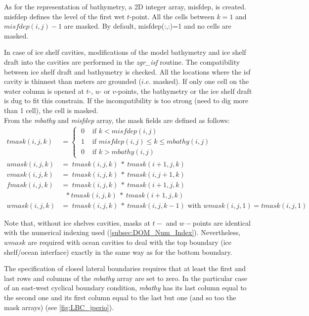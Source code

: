 \documentclass[../tex_main/NEMO_manual]{subfiles}
\begin{document}
As for the representation of bathymetry, a 2D integer array, misfdep, is created.
misfdep defines the level of the first wet $t$-point.
All the cells between $k=1$ and $misfdep(i,j)-1$ are masked.
By default, misfdep(:,:)=1 and no cells are masked.

In case of ice shelf cavities, modifications of the model bathymetry and ice shelf draft into 
the cavities are performed in the \textit{zgr\_isf} routine.
The compatibility between ice shelf draft and bathymetry is checked. 
All the locations where the isf cavity is thinnest than  meters are grounded ($i.e.$ masked). 
If only one cell on the water column is opened at $t$-, $u$- or $v$-points,
the bathymetry or the ice shelf draft is dug to fit this constrain.
If the incompatibility is too strong (need to dig more than 1 cell), the cell is masked.\\ 

From the \textit{mbathy} and \textit{misfdep} array, the mask fields are defined as follows:
\begin{align*}
tmask(i,j,k) &= \begin{cases}   \; 0&   \text{ if $k < misfdep(i,j) $ } \\
                                \; 1&   \text{ if $misfdep(i,j) \leq k\leq mbathy(i,j)$  }    \\
                                \; 0&   \text{ if $k > mbathy(i,j)$  }    \end{cases}     \\
umask(i,j,k) &=         \; tmask(i,j,k) \ * \ tmask(i+1,j,k)	\\
vmask(i,j,k) &=         \; tmask(i,j,k) \ * \ tmask(i,j+1,k)	\\
fmask(i,j,k) &=         \; tmask(i,j,k) \ * \ tmask(i+1,j,k)	\\
             &    \ \ \, * tmask(i,j,k) \ * \ tmask(i+1,j,k) \\
wmask(i,j,k) &=         \; tmask(i,j,k) \ * \ tmask(i,j,k-1) \text{ with } wmask(i,j,1) = tmask(i,j,1) 
\end{align*}

Note that, without ice shelves cavities,
masks at $t-$ and $w-$points are identical with the numerical indexing used (\autoref{subsec:DOM_Num_Index}).
Nevertheless, $wmask$ are required with ocean cavities to deal with the top boundary (ice shelf/ocean interface) 
exactly in the same way as for the bottom boundary. 

The specification of closed lateral boundaries requires that at least
the first and last rows and columns of the \textit{mbathy} array are set to zero.
In the particular case of an east-west cyclical boundary condition,
\textit{mbathy} has its last column equal to the second one and its first column equal to the last but one 
(and so too the mask arrays) (see \autoref{fig:LBC_jperio}).
\end{document}

